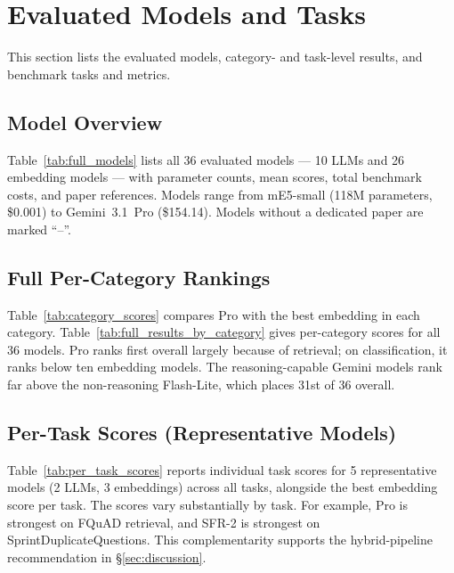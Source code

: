 


\section{Evaluated Models and Tasks}
\label{app:models_detail}

This section lists the evaluated models, category- and task-level results, and benchmark tasks and metrics.

\subsection{Model Overview}

Table~\ref{tab:full_models} lists all 36 evaluated models — 10 LLMs and 26 embedding models — with parameter counts, mean \mteblm{} scores, total benchmark costs, and paper references.
Models range from mE5-small (118M parameters, \$0.001) to Gemini~3.1~Pro (\$154.14).
Models without a dedicated paper are marked ``--''.



\subsection{Full Per-Category Rankings}
\label{app:models}

Table~\ref{tab:category_scores} compares Pro with the best embedding in each category. Table~\ref{tab:full_results_by_category} gives per-category scores for all 36 models.
Pro ranks first overall largely because of retrieval; on classification, it ranks below ten embedding models.
The reasoning-capable Gemini models rank far above the non-reasoning Flash-Lite, which places 31st of 36 overall.




\subsection{Per-Task Scores (Representative Models)}
\label{app:per_task}

Table~\ref{tab:per_task_scores} reports individual task scores for 5 representative models (2 LLMs, 3 embeddings) across all \mteblm{} tasks, alongside the best embedding score per task.
The scores vary substantially by task. For example, Pro is strongest on FQuAD retrieval, and SFR-2 is strongest on SprintDuplicateQuestions.
This complementarity supports the hybrid-pipeline recommendation in \S\ref{sec:discussion}.


